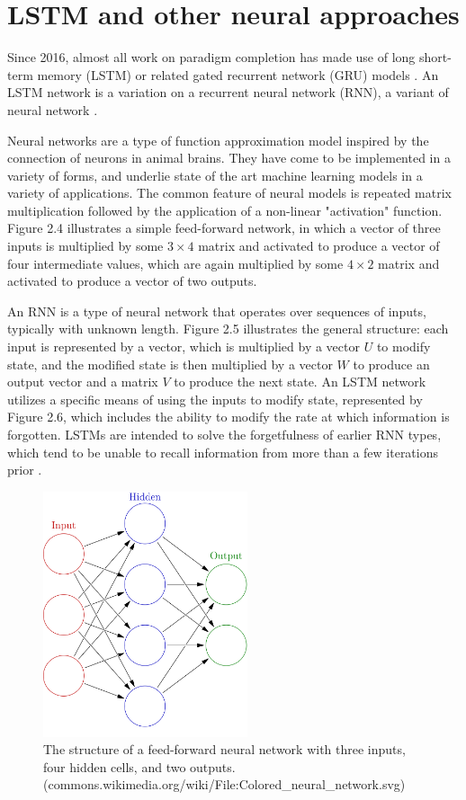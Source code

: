\section{LSTM and other neural approaches}

Since 2016, almost all work on paradigm completion has made use of long short-term memory (LSTM) or related gated recurrent network (GRU) models \parencite{Faruqui2015} \parencite{Cotterell2016} \parencite{Cotterell2017} \parencite{Cotterell2018b} \parencite{McCarthy2019}. An LSTM network is a variation on a recurrent neural network (RNN), a variant of neural network \parencite{Hochreiter1997}.

Neural networks are a type of function approximation model inspired by the connection of neurons in animal brains. They have come to be implemented in a variety of forms, and underlie state of the art machine learning models in a variety of applications. The common feature of neural models is repeated matrix multiplication followed by the application of a non-linear "activation" function. Figure 2.4 illustrates a simple feed-forward network, in which a vector of three inputs is multiplied by some $3 \times 4$ matrix and activated to produce a vector of four intermediate values, which are again multiplied by some $4 \times 2$ matrix and activated to produce a vector of two outputs.

An RNN is a type of neural network that operates over sequences of inputs, typically with unknown length. Figure 2.5 illustrates the general structure: each input is represented by a vector, which is multiplied by a vector $U$ to modify state, and the modified state is then multiplied by a vector $W$ to produce an output vector and a matrix $V$ to produce the next state. An LSTM network utilizes a specific means of using the inputs to modify state, represented by Figure 2.6, which includes the ability to modify the rate at which information is forgotten. LSTMs are intended to solve the forgetfulness of earlier RNN types, which tend to be unable to recall information from more than a few iterations prior \parencite{Hochreiter1997}.

\begin{figure}[t]
\includegraphics[width=6cm]{images/1000px-Colored_neural_network.png}
\centering
\caption{The structure of a feed-forward neural network with three inputs, four hidden cells, and two outputs. (commons.wikimedia.org/wiki/File:Colored\_neural\_network.svg)}
\end{figure}

